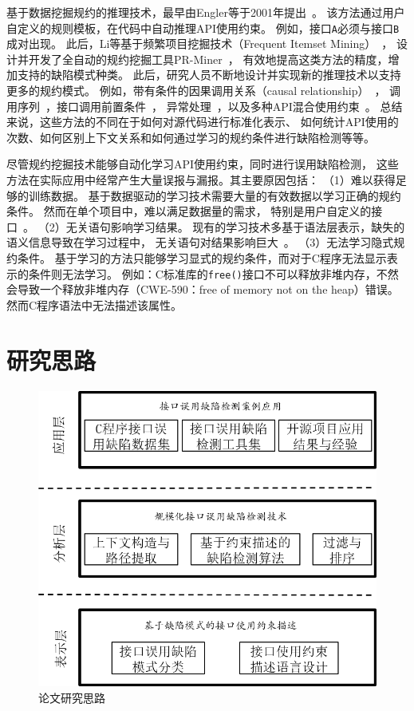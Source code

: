 基于数据挖掘规约的推理技术，最早由Engler等于2001年提出~\cite{01-sosp-mining}。
该方法通过用户自定义的规则模板，在代码中自动推理API使用约束。
例如，接口\texttt{A}必须与接口\texttt{B}成对出现。
此后，Li等基于频繁项目挖掘技术（Frequent Itemset Mining）~\cite{03-fimi-frequent}，
设计并开发了全自动的规约挖掘工具PR-Miner~\cite{05-fse-prminer}，
有效地提高这类方法的精度，增加支持的缺陷模式种类。
此后，研究人员不断地设计并实现新的推理技术以支持更多的规约模式。
例如，带有条件的因果调用关系（causal relationship）~\cite{07-fse-temporal}，
调用序列~\cite{09-ase-sequence}，接口调用前置条件~\cite{14-fse-pre}，
异常处理~\cite{16-ase-apex}，以及多种API混合使用约束~\cite{16-sec-apisan}。
总结来说，这些方法的不同在于如何对源代码进行标准化表示、
如何统计API使用的次数、如何区别上下文关系和如何通过学习的规约条件进行缺陷检测等等。

尽管规约挖掘技术能够自动化学习API使用约束，同时进行误用缺陷检测，
这些方法在实际应用中经常产生大量误报与漏报。其主要原因包括：
（1）难以获得足够的训练数据。
基于数据驱动的学习技术需要大量的有效数据以学习正确的规约条件。
然而在单个项目中，难以满足数据量的需求，
特别是用户自定义的接口~\cite{15-kernel-sv,survey18}。
（2）无关语句影响学习结果。
现有的学习技术多基于语法层表示，缺失的语义信息导致在学习过程中，
无关语句对结果影响巨大~\cite{16-icse-antminer}。
（3）无法学习隐式规约条件。
基于学习的方法只能够学习显式的规约条件，而对于C程序无法显示表示的条件则无法学习。
例如：C标准库的\texttt{free()}接口不可以释放非堆内存，不然会导致一个释放非堆内存（CWE-590：free of memory not on the heap）错误。
然而C程序语法中无法描述该属性。


\section{研究思路}

\begin{figure}[b]
	\centering
	\includegraphics[width=0.85\linewidth]{figures/cp1-overview.png}
	\caption{
		论文研究思路
	}
	\label{fig:1-3-overview}
\end{figure}

